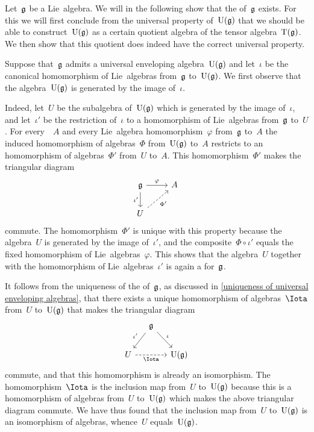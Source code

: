 \begin{fluff}
  Let~$\mathfrak{g}$ be a Lie~algebra.
  We will in the following show that the {\ua} of~$\mathfrak{g}$ exists.
  For this we will first conclude from the universal property of~$\operatorname{U}(\mathfrak{g})$ that we should be able to construct~$\operatorname{U}(\mathfrak{g})$ as a certain quotient algebra of the tensor algebra~$\operatorname{T}(\mathfrak{g})$.
  We then show that this quotient does indeed have the correct universal property.

  Suppose that~$\mathfrak{g}$ admits a universal enveloping algebra~$\operatorname{U}(\mathfrak{g})$ and let~$\iota$ be the canonical homomorphism of Lie~algebras from~$\mathfrak{g}$ to~$\operatorname{U}(\mathfrak{g})$.
  We first observe that the algebra~$\operatorname{U}(\mathfrak{g})$ is generated by the image of~$\iota$.

  Indeed, let~$U$ be the subalgebra of~$\operatorname{U}(\mathfrak{g})$ which is generated by the image of~$\iota$, and let~$\iota'$ be the restriction of~$\iota$ to a homomorphism of Lie~algebras from~$\mathfrak{g}$ to~$U$.
  For every~{\algebra{$\kf$}}~$A$ and every Lie~algebra homomorphism~$\varphi$ from~$\mathfrak{g}$ to~$A$ the induced homomorphism of algebras~$\Phi$ from~$\operatorname{U}(\mathfrak{g})$ to~$A$ restricts to an homomorphism of algebras~$\Phi'$ from~$U$ to~$A$.
  This homomorphism~$\Phi'$ makes the triangular diagram
  \[
    \begin{tikzcd}
      \glie
      \arrow{r}[above]{\varphi}
      \arrow{d}[left]{\iota'}
      &
      A
      \\
      U
      \arrow[dashed]{ur}[below right]{\Phi'}
      &
      {}
    \end{tikzcd}
  \]
  commute.
  The homomorphism~$\Phi'$ is unique with this property because the algebra~$U$ is generated by the image of~$\iota'$, and the composite~$\Phi \circ \iota'$ equals the fixed homomorphism of Lie~algebras~$\varphi$.
  This shows that the algebra~$U$ together with the homomorphism of Lie~algebras~$\iota'$ is again a {\ua} for~$\mathfrak{g}$.
  
  It follows from the uniqueness of the {\ua} of~$\mathfrak{g}$, as discussed in \cref{uniqueness of universal enveloping algebras}, that there exists a unique homomorphism of algebras~$\Iota$ from~$U$ to~$\operatorname{U}(\mathfrak{g})$ that makes the triangular diagram
  \[
    \begin{tikzcd}[column sep = small]
      {}
      &
      \glie
      \arrow{dl}[above left]{\iota'}
      \arrow{dr}[above right]{\iota}
      &
      {}
      \\
      U
      \arrow[dashed]{rr}[below]{\Iota}
      &
      {}
      &
      \Univ(\glie)
    \end{tikzcd}
  \]
  commute, and that this homomorphism is already an isomorphism.
  The homomorphism~$\Iota$ is the inclusion map from~$U$ to~$\operatorname{U}(\mathfrak{g})$ because this is a homomorphism of algebras from~$U$ to~$\operatorname{U}(\mathfrak{g})$ which makes the above triangular diagram commute.
  We have thus found that the inclusion map from~$U$ to~$\operatorname{U}(\mathfrak{g})$ is an isomorphism of algebras, whence~$U$ equals~$\operatorname{U}(\mathfrak{g})$.


\end{fluff}
